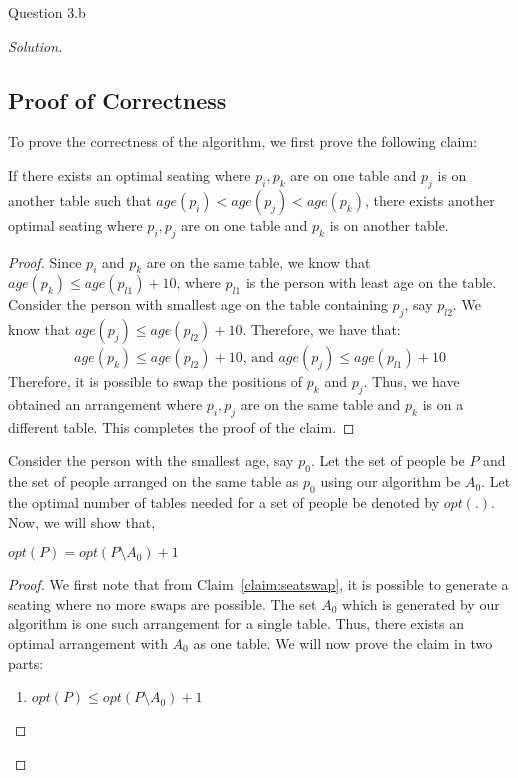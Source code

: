 \begin{solution}{Question 3.b}
\begin{proof}[Solution]
        \subsection*{Proof of Correctness}
        To prove the correctness of the algorithm, we first prove the following claim:
        \begin{claim}\label{claim:seatswap}
            If there exists an optimal seating where $p_i, p_k$ are on one table and $p_j$ is on another table such that $age(p_i)<age(p_j)<age(p_k)$, there exists another optimal seating where $p_i, p_j$ are on one table and $p_k$ is on another table.
        \end{claim}
        \begin{proof}
            Since $p_i$ and $p_k$ are on the same table, we know that $age(p_k)\leq age(p_{l1})+10$, where $p_{l1}$ is the person with least age on the table. Consider the person with smallest age on the table containing $p_j$, say $p_{l2}$. We know that $age(p_j)\leq age(p_{l2})+10$. Therefore, we have that:
            \begin{equation}
                age(p_k)\leq age(p_{l2})+10\text{, and }age(p_j)\leq age(p_{l1})+10
            \end{equation}
            Therefore, it is possible to swap the positions of $p_k$ and $p_j$. Thus, we have obtained an arrangement where $p_i, p_j$ are on the same table and $p_k$ is on a different table. This completes the proof of the claim.
        \end{proof}
        Consider the person with the smallest age, say $p_0$. Let the set of people be $P$ and the set of people arranged on the same table as $p_0$ using our algorithm be $A_0$. Let the optimal number of tables needed for a set of people be denoted by $opt(.)$. Now, we will show that,
        \begin{claim}\label{claim:optseat}
            $opt(P)=opt(P\setminus A_0)+1$
        \end{claim}
        \begin{proof}
            We first note that from Claim~\ref{claim:seatswap}, it is possible to generate a seating where no more swaps are possible. The set $A_0$ which is generated by our algorithm is one such arrangement for a single table. Thus, there exists an optimal arrangement with $A_0$ as one table. We will now prove the claim in two parts:
            \begin{enumerate}
                \item{$opt(P)\leq opt(P\setminus A_0)+1$}\\

\end{enumerate}
\end{proof}
\end{proof}
\end{solution}
